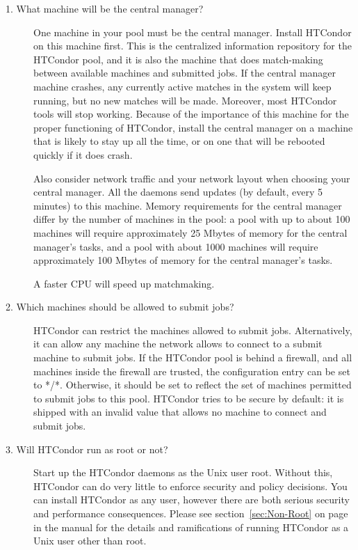 \begin{description}

\item[1. What machine will be the central manager?]

One machine in your pool must be the central manager.
Install HTCondor on this machine first.
This is the centralized information repository for the HTCondor pool,
and it is also the
machine that does match-making between available machines and
submitted jobs.
If the central manager machine crashes, any currently active
matches in the system will keep running, but no new matches will be
made.  Moreover, most HTCondor tools will stop working.  Because of the
importance of this machine for the proper functioning of HTCondor,
install the central manager on a machine that is likely to stay up all the
time, or on one that will be rebooted quickly if it does crash.

Also consider
network traffic and your network layout when choosing your central
manager.
All the daemons send updates (by default, every 5 minutes) to this machine.
Memory requirements for the central manager differ by the number of machines
in the pool:
a pool with up to about 100 machines will require approximately
25 Mbytes of memory for the central manager's tasks,
and a pool with about 1000 machines will require approximately
100 Mbytes of memory for the central manager's tasks.

A faster CPU will speed up matchmaking. 

\item[2. Which machines should be allowed to submit jobs?]

HTCondor can restrict the machines allowed to submit jobs.  Alternatively, 
it can allow any machine the network allows to connect to a submit machine
to submit jobs.  If the HTCondor pool is behind a firewall, and all machines
inside the firewall are trusted, the  configuration
entry can be set to */*.  Otherwise, it should be set to reflect
the set of machines permitted to submit jobs to this pool.
HTCondor tries to be secure by default: it is shipped with an invalid value
that allows no machine to connect and submit jobs.

\item[3. Will HTCondor run as root or not?]

Start up the HTCondor daemons as the Unix user root.
Without this,
HTCondor can do very little to enforce security and policy
decisions.
You can install HTCondor as any user,
however there are both serious security and performance consequences.
Please see section~\ref{sec:Non-Root} on page~\pageref{sec:Non-Root}
in the manual for the details and ramifications of
running HTCondor as a Unix user other than root.


\end{description}
